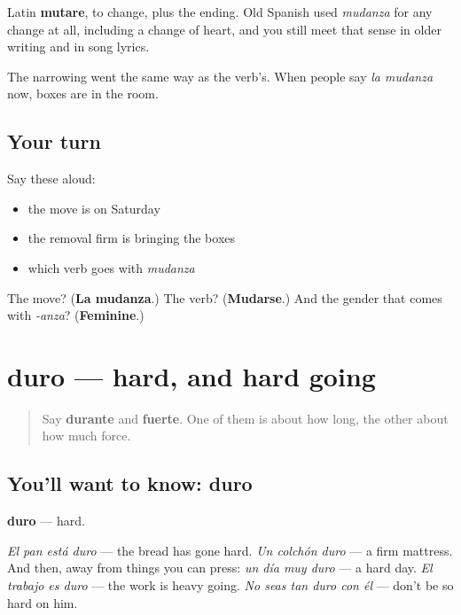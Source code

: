 \begin{cousinweb}
Latin \textbf{mutare}, to change, plus the ending. Old Spanish used \emph{mudanza} for any change at all, including a change of heart, and you still meet that sense in older writing and in song lyrics.

The narrowing went the same way as the verb's. When people say \emph{la mudanza} now, boxes are in the room.
\end{cousinweb}

\subsection*{Your turn}
Say these aloud:

\begin{itemize}
\raggedright
  \item the move is on Saturday
  \item the removal firm is bringing the boxes
  \item which verb goes with \emph{mudanza}
\end{itemize}

\begin{tcolorbox}[breakable,colback=teal!4,colframe=teal!35!black,title={Before you move on}]
The move? (\textbf{La mudanza}.) The verb? (\textbf{Mudarse}.) And the gender that comes with \emph{-anza}? (\textbf{Feminine}.)
\end{tcolorbox}
\section[duro]{duro — hard, and hard going}

\label{lesson:ES-C448-duro}



\begin{quote}
Say \textbf{durante} and \textbf{fuerte}. One of them is about how long, the other about how much force.
\end{quote}

\subsection*{You'll want to know: duro}
\textbf{duro} — hard.

\emph{El pan está duro} — the bread has gone hard. \emph{Un colchón duro} — a firm mattress. And then, away from things you can press: \emph{un día muy duro} — a hard day. \emph{El trabajo es duro} — the work is heavy going. \emph{No seas tan duro con él} — don't be so hard on him.

